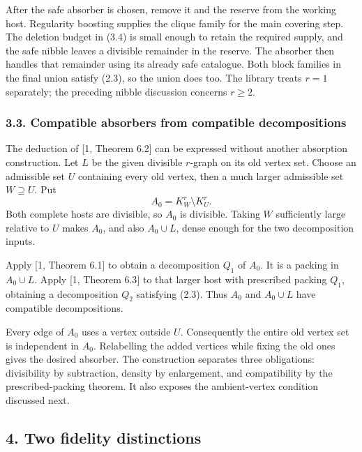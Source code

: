 \documentclass[english,11pt,a4paper]{article}
\begin{document}
After the safe absorber is chosen, remove it and the reserve from the working host. Regularity boosting supplies the clique family for the main covering step. The deletion budget in (3.4) is small enough to retain the required supply, and the safe nibble leaves a divisible remainder in the reserve. The absorber then handles that remainder using its already safe catalogue. Both block families in the final union satisfy (2.3), so the union does too. The library treats \(r=1\) separately; the preceding nibble discussion concerns \(r\ge2\).


\subsubsection{3.3. Compatible absorbers from compatible decompositions}\label{compatible-absorbers-from-compatible-decompositions}

The deduction of {[}1, Theorem 6.2{]} can be expressed without another absorption construction. Let \(L\) be the given divisible \(r\)-graph on its old vertex set. Choose an admissible set \(U\) containing every old vertex, then a much larger admissible set \(W\supseteq U\). Put \[A_0=K_W^r\setminus K_U^r.
\tag{3.5}\] Both complete hosts are divisible, so \(A_0\) is divisible. Taking \(W\) sufficiently large relative to \(U\) makes \(A_0\), and also \(A_0\cup L\), dense enough for the two decomposition inputs.

Apply {[}1, Theorem 6.1{]} to obtain a decomposition \(Q_1\) of \(A_0\). It is a packing in \(A_0\cup L\). Apply {[}1, Theorem 6.3{]} to that larger host with prescribed packing \(Q_1\), obtaining a decomposition \(Q_2\) satisfying (2.3). Thus \(A_0\) and \(A_0\cup L\) have compatible decompositions.

Every edge of \(A_0\) uses a vertex outside \(U\). Consequently the entire old vertex set is independent in \(A_0\). Relabelling the added vertices while fixing the old ones gives the desired absorber. The construction separates three obligations: divisibility by subtraction, density by enlargement, and compatibility by the prescribed-packing theorem. It also exposes the ambient-vertex condition discussed next.

\subsection{4. Two fidelity distinctions}\label{two-fidelity-distinctions}


\end{document}

